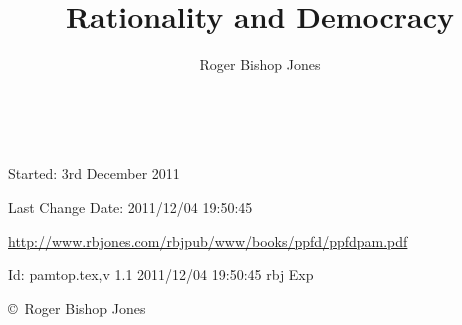 \documentclass[10pt,a4paper.titlepage,openany,twocolumn]{book}
\author{Roger Bishop Jones}
\title{Rationality and Democracy}
\begin{document}
\frontmatter

\begin{titlepage}
\maketitle

\vfill

\begin{centering}

\

\vfill

{\footnotesize

Started: 3rd December 2011

Last Change $ $Date: 2011/12/04 19:50:45 $ $

\href{http://www.rbjones.com/rbjpub/www/books/ppfd/ppfdpam.pdf}
{http://www.rbjones.com/rbjpub/www/books/ppfd/ppfdpam.pdf}

$ $Id: pamtop.tex,v 1.1 2011/12/04 19:50:45 rbj Exp $ $

\copyright\ Roger Bishop Jones

}%

\end{centering}

\thispagestyle{empty}
\end{titlepage}

\onecolumn

{\parskip=0pt\tableofcontents}

\vfill

\pagebreak

\twocolumn
\end{document}
